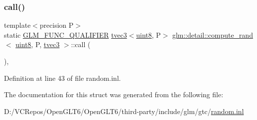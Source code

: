 \subsubsection{\texorpdfstring{call()}{call()}}
{\footnotesize\ttfamily template$<$precision P$>$ \\
static \mbox{\hyperlink{setup_8hpp_a33fdea6f91c5f834105f7415e2a64407}{G\+L\+M\+\_\+\+F\+U\+N\+C\+\_\+\+Q\+U\+A\+L\+I\+F\+I\+ER}} \mbox{\hyperlink{structglm_1_1tvec3}{tvec3}}$<$\mbox{\hyperlink{namespaceglm_1_1detail_aef2588f97d090cc19fbbe0c74fe17c8f}{uint8}}, P$>$ \mbox{\hyperlink{structglm_1_1detail_1_1compute__rand}{glm\+::detail\+::compute\+\_\+rand}}$<$ \mbox{\hyperlink{namespaceglm_1_1detail_aef2588f97d090cc19fbbe0c74fe17c8f}{uint8}}, P, \mbox{\hyperlink{structglm_1_1tvec3}{tvec3}} $>$\+::call (\begin{DoxyParamCaption}{ }\end{DoxyParamCaption})\hspace{0.3cm}{\ttfamily [inline]}, {\ttfamily [static]}}



Definition at line 43 of file random.\+inl.



The documentation for this struct was generated from the following file\+:\begin{DoxyCompactItemize}
\item 
D\+:/\+V\+C\+Repos/\+Open\+G\+L\+T6/\+Open\+G\+L\+T6/third-\/party/include/glm/gtc/\mbox{\hyperlink{random_8inl}{random.\+inl}}\end{DoxyCompactItemize}
